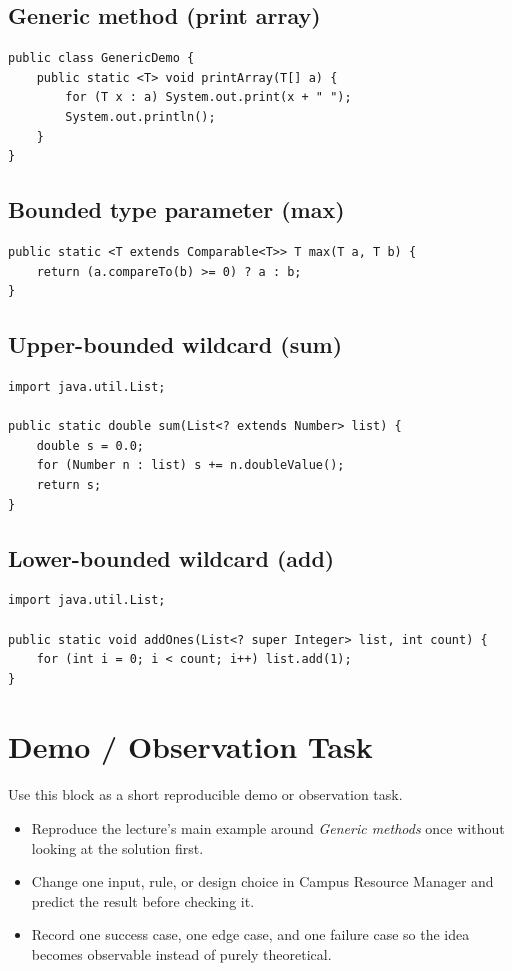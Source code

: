 \documentclass[11pt]{article}
\begin{document}
\subsection*{Generic method (print array)}
\begin{lstlisting}
public class GenericDemo {
    public static <T> void printArray(T[] a) {
        for (T x : a) System.out.print(x + " ");
        System.out.println();
    }
}
\end{lstlisting}

\subsection*{Bounded type parameter (max)}
\begin{lstlisting}
public static <T extends Comparable<T>> T max(T a, T b) {
    return (a.compareTo(b) >= 0) ? a : b;
}
\end{lstlisting}

\subsection*{Upper-bounded wildcard (sum)}
\begin{lstlisting}
import java.util.List;

public static double sum(List<? extends Number> list) {
    double s = 0.0;
    for (Number n : list) s += n.doubleValue();
    return s;
}
\end{lstlisting}

\subsection*{Lower-bounded wildcard (add)}
\begin{lstlisting}
import java.util.List;

public static void addOnes(List<? super Integer> list, int count) {
    for (int i = 0; i < count; i++) list.add(1);
}
\end{lstlisting}

\section{Demo / Observation Task}
Use this block as a short reproducible demo or observation task.
\begin{itemize}
  \item Reproduce the lecture's main example around \textit{Generic methods} once without looking at the solution first.
  \item Change one input, rule, or design choice in Campus Resource Manager and predict the result before checking it.
  \item Record one success case, one edge case, and one failure case so the idea becomes observable instead of purely theoretical.
\end{itemize}
\notesources{\OOPSUnitIVSources}
\end{document}
